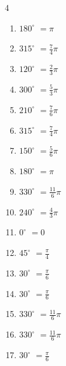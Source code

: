 \begin{multicols}{4}
\begin{enumerate}
  \item $\displaystyle 180^{\circ}$
        $\displaystyle =\pi$

  \item $\displaystyle 315^{\circ}$
        $\displaystyle =\frac{7}{4}\pi$

  \item $\displaystyle 120^{\circ}$
        $\displaystyle =\frac{2}{3}\pi$

  \item $\displaystyle 300^{\circ}$
        $\displaystyle =\frac{5}{3}\pi$

  \item $\displaystyle 210^{\circ}$
        $\displaystyle =\frac{7}{6}\pi$

  \item $\displaystyle 315^{\circ}$
        $\displaystyle =\frac{7}{4}\pi$

  \item $\displaystyle 150^{\circ}$
        $\displaystyle =\frac{5}{6}\pi$

  \item $\displaystyle 180^{\circ}$
        $\displaystyle =\pi$

\columnbreak %

  \item $\displaystyle 330^{\circ}$
        $\displaystyle =\frac{11}{6}\pi$

  \item $\displaystyle 240^{\circ}$
        $\displaystyle =\frac{4}{3}\pi$

  \item $\displaystyle 0^{\circ}$
        $\displaystyle =0$

  \item $\displaystyle 45^{\circ}$
        $\displaystyle =\frac{\pi}{4}$

  \item $\displaystyle 30^{\circ}$
        $\displaystyle =\frac{\pi}{6}$

  \item $\displaystyle 30^{\circ}$
        $\displaystyle =\frac{\pi}{6}$

  \item $\displaystyle 330^{\circ}$
        $\displaystyle =\frac{11}{6}\pi$

  \item $\displaystyle 330^{\circ}$
        $\displaystyle =\frac{11}{6}\pi$

  \item $\displaystyle 30^{\circ}$
        $\displaystyle =\frac{\pi}{6}$


\end{enumerate}
\end{multicols}
